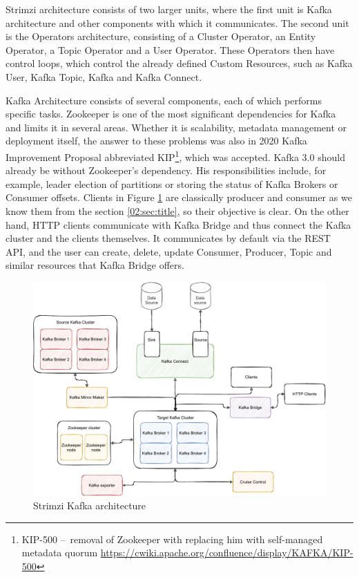 Strimzi architecture consists of two larger units, where the first unit is Kafka architecture and other components with which it communicates. The second unit is the Operators architecture, consisting of a Cluster Operator, an Entity Operator, a Topic Operator and a User Operator. These Operators then have control loops, which control the already defined Custom Resources, such as Kafka User, Kafka Topic, Kafka and Kafka Connect.

Kafka Architecture consists of several components, each of which performs specific tasks. Zookeeper is one of the most significant dependencies for Kafka and limits it in several areas. Whether it is scalability, metadata management or deployment itself, the answer to these problems was also in 2020 Kafka Improvement Proposal abbreviated KIP\footnote{KIP-500 \---\ removal of Zookeeper with replacing him with self-managed metadata quorum \url{https://cwiki.apache.org/confluence/display/KAFKA/KIP-500}}, which was accepted. Kafka 3.0 should already be without Zookeeper's dependency. His responsibilities include, for example, leader election of partitions or storing the status of Kafka Brokers or Consumer offsets. Clients in Figure \ref{03:fig:strimziKafkaArchitecture} are classically producer and consumer as we know them from the section \ref{02:sec:title}, so their objective is clear. On the other hand, HTTP clients communicate with Kafka Bridge and thus connect the Kafka cluster and the clients themselves. It communicates by default via the REST API, and the user can create, delete, update Consumer, Producer, Topic and similar resources that Kafka Bridge offers. 
\begin{figure}[!ht]
    \centering
    \includegraphics[scale=0.75]{obrazky-figures/02-preliminaries/03-strimzi/03-strimzi-kafka-architecture (1).pdf}
    \caption{Strimzi Kafka architecture}
    \label{03:fig:strimziKafkaArchitecture}
\end{figure}
